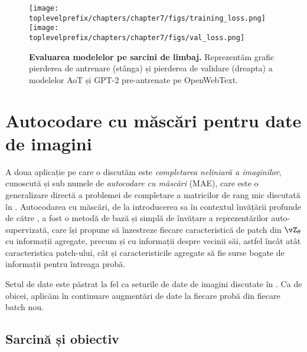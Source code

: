 \documentclass[../../book-main_ro.tex]{subfiles}
\begin{document}
\begin{figure*}[t]
\begin{center}
\texttt{[image: \\toplevelprefix/chapters/chapter7/figs/training\_loss.png]} \hspace{0.4in}
\texttt{[image: \\toplevelprefix/chapters/chapter7/figs/val\_loss.png]}
    \vspace{-0.15in}
\caption{\centering \textbf{Evaluarea modelelor pe sarcini de limbaj.} Reprezentăm grafic pierderea de antrenare (stânga) și pierderea de validare (dreapta) a modelelor AoT și GPT-2 pre-antrenate pe OpenWebText.}  \label{fig:loss} 
\end{center}
\vspace{-0.15in}
\end{figure*} 




 

\section{Autocodare cu măscări pentru date de imagini}\label{sec:image_completion}

A doua aplicație pe care o discutăm este \textit{completarea neliniară a imaginilor}, cunoscută și sub numele de \textit{autocodare cu măscări} (MAE), care este o generalizare directă a problemei de completare a matricilor de rang mic discutată în . Autocodarea cu măscări, de la introducerea sa în contextul învățării profunde de către \cite{he2022masked}, a fost o metodă de bază și simplă de învățare a reprezentărilor auto-supervizată, care își propune să înzestreze fiecare caracteristică de patch din \(\vZ_{\theta}\) cu informații agregate, precum și cu informații despre vecinii săi, astfel încât atât caracteristica patch-ului, cât și caracteristicile agregate să fie surse bogate de informații pentru întreaga probă. 

Setul de date este păstrat la fel ca seturile de date de imagini discutate în . Ca de obicei, aplicăm în continuare augmentări de date la fiecare probă din fiecare batch nou. 

\subsection{Sarcină și obiectiv}\label{sub:image_completion_objective}
\end{document}
